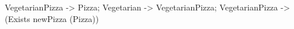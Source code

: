VegetarianPizza -> Pizza;
Vegetarian -> VegetarianPizza;
VegetarianPizza -> (Exists newPizza (Pizza))
